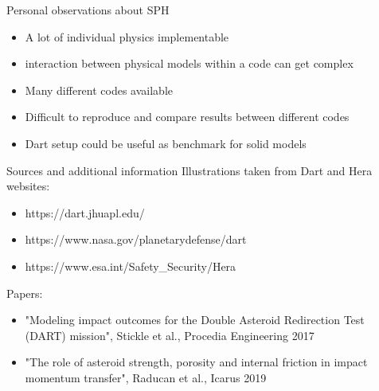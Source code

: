 \documentclass{beamer}
\begin{document}
\begin{frame}{Personal observations about SPH}
	\begin{itemize}
	\item A lot of individual physics implementable 
	\item interaction between physical models within a code can get complex
	\item Many different codes available 
	\item Difficult to reproduce and compare results between different codes
	\item Dart setup could be useful as benchmark for solid models
	\end{itemize}
\end{frame}

\begin{frame}{Sources and additional information}
	Illustrations taken from Dart and Hera websites:
\begin{itemize}
	\item https://dart.jhuapl.edu/ 
	\item https://www.nasa.gov/planetarydefense/dart
	\item https://www.esa.int/Safety\_Security/Hera
\end{itemize} 
	Papers:
\begin{itemize}
	\item "Modeling impact outcomes for the Double Asteroid Redirection Test (DART) mission", Stickle et al., Procedia Engineering 2017
	\item "The role of asteroid strength, porosity and internal friction in impact momentum transfer", Raducan et al., Icarus 2019
\end{itemize} 
\end{frame}
\end{document}
